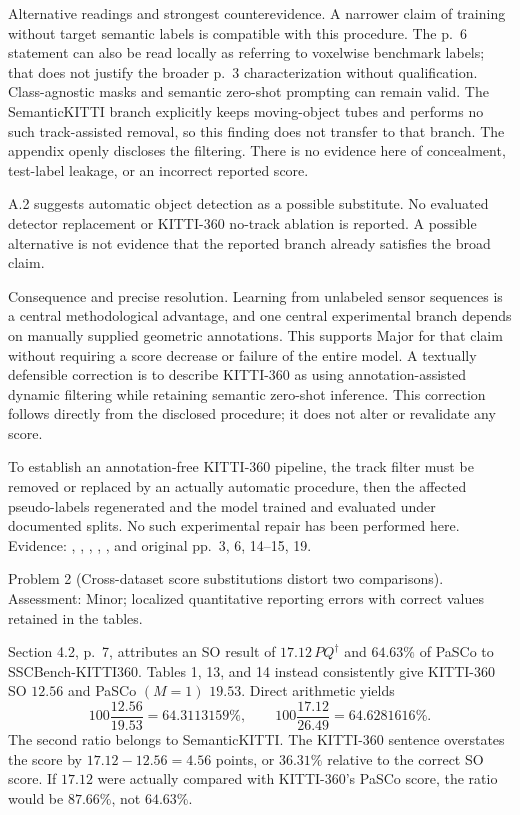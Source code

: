 \documentclass[10pt]{article}
\begin{document}
Alternative readings and strongest counterevidence. A narrower claim of training without target semantic labels is compatible with this procedure. The p. 6 statement can also be read locally as referring to voxelwise benchmark labels; that does not justify the broader p. 3 characterization without qualification. Class-agnostic masks and semantic zero-shot prompting can remain valid. The SemanticKITTI branch explicitly keeps moving-object tubes and performs no such track-assisted removal, so this finding does not transfer to that branch. The appendix openly discloses the filtering. There is no evidence here of concealment, test-label leakage, or an incorrect reported score.\par
A.2 suggests automatic object detection as a possible substitute. No evaluated detector replacement or KITTI-360 no-track ablation is reported. A possible alternative is not evidence that the reported branch already satisfies the broad claim.\par
Consequence and precise resolution. Learning from unlabeled sensor sequences is a central methodological advantage, and one central experimental branch depends on manually supplied geometric annotations. This supports Major for that claim without requiring a score decrease or failure of the entire model. A textually defensible correction is to describe KITTI-360 as using annotation-assisted dynamic filtering while retaining semantic zero-shot inference. This correction follows directly from the disclosed procedure; it does not alter or revalidate any score.\par
To establish an annotation-free KITTI-360 pipeline, the track filter must be removed or replaced by an actually automatic procedure, then the affected pseudo-labels regenerated and the model trained and evaluated under documented splits. No such experimental repair has been performed here. Evidence: , , , , , and original pp. 3, 6, 14–15, 19.\par
Problem 2 (Cross-dataset score substitutions distort two comparisons).  Assessment: Minor; localized quantitative reporting errors with correct values retained in the tables.\par
Section 4.2, p. 7, attributes an SO result of \(17.12\,PQ^\dagger\) and \(64.63\%\) of PaSCo to SSCBench-KITTI360. Tables 1, 13, and 14 instead consistently give KITTI-360 SO \(12.56\) and PaSCo \((M=1)\) \(19.53\). Direct arithmetic yields \[100\frac{12.56}{19.53}=64.3113159\%,\qquad
100\frac{17.12}{26.49}=64.6281616\%.\] The second ratio belongs to SemanticKITTI. The KITTI-360 sentence overstates the score by \(17.12-12.56=4.56\) points, or \(36.31\%\) relative to the correct SO score. If \(17.12\) were actually compared with KITTI-360’s PaSCo score, the ratio would be \(87.66\%\), not \(64.63\%\).\par
\end{document}
